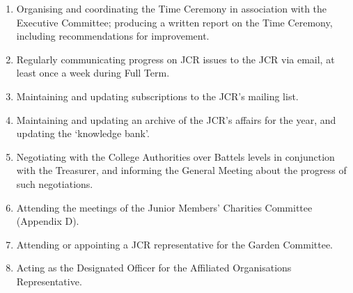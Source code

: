 \begin{enumerate}
	\item Organising and coordinating the Time Ceremony in association with the Executive Committee; producing a written report on the Time Ceremony, including recommendations for improvement.
	\item Regularly communicating progress on JCR issues to the JCR via email, at least once a week during Full Term.
	\item Maintaining and updating subscriptions to the JCR's mailing list.
	\item Maintaining and updating an archive of the JCR's affairs for the year, and updating the `knowledge bank'.
	\item Negotiating with the College Authorities over Battels levels in conjunction with the Treasurer, and informing the General Meeting about the progress of such negotiations.
	\item Attending the meetings of the Junior Members' Charities Committee (Appendix D).
	\item Attending or appointing a JCR representative for the Garden Committee.
	\item Acting as the Designated Officer for the Affiliated Organisations Representative.
\end{enumerate}
